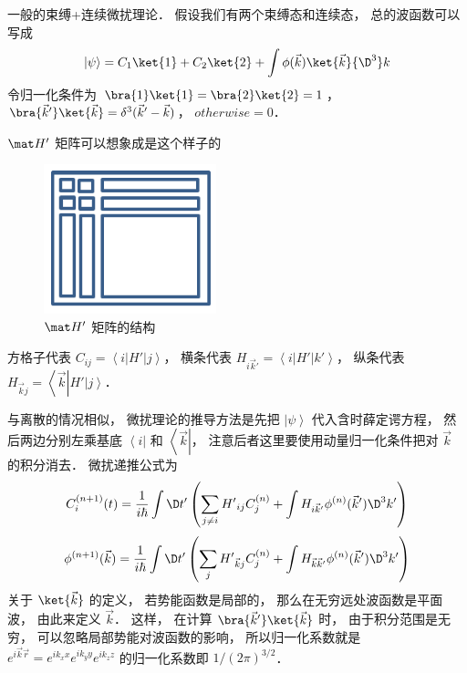 

一般的束缚+连续微扰理论． 假设我们有两个束缚态和连续态， 总的波函数可以写成
 \begin{equation}
\left| \psi  \right\rangle  = {C_1}\ket{1}  + {C_2}\ket{2}  + \int {\phi (\vec k)\ket{\vec k}{\D ^3}k} 
\end{equation}
令归一化条件为 $\bra{1}\ket{1} = \bra{2}\ket{2} = 1$，  $\bra{\vec k'}\ket{\vec k}  = {\delta ^3}(\vec k' - \vec k)$，  $otherwise = 0$． 

 $\mat H'$  矩阵可以想象成是这个样子的
\begin{figure}[h]
\centering
\includegraphics[width=5cm]{./figures/PTCont.pdf}
\caption{$\mat H'$ 矩阵的结构} 
\end{figure}

方格子代表 ${C_{ij}} = \left\langle i \right|H'\left| j \right\rangle $，  横条代表 ${H_{i\vec k'}} = \left\langle i \right|H'\left| {k'} \right\rangle $，  纵条代表 ${H_{\vec kj}} = \left\langle {\vec k} \right|H'\left| j \right\rangle $． 

与离散的情况相似， 微扰理论的推导方法是先把 $\left| \psi  \right\rangle $ 代入含时薛定谔方程， 然后两边分别左乘基底 $\left\langle i \right|$ 和 $\left\langle {\vec k} \right|$，  注意后者这里要使用动量归一化条件把对 $\vec k$ 的积分消去． 微扰递推公式为
 \begin{equation}
C_i^{(n + 1)}(t) = \frac{1}{{i\hbar }}\int {\D t'\left( {\sum\limits_{j \ne i} {{{H'}_{ij}}C_j^{(n)}}  + \int {{H_{i\vec k'}}{\phi ^{(n)}}(\vec k'){\D ^3}k'} } \right)} 
\end{equation}
 \begin{equation}
 {\phi ^{(n + 1)}}(\vec k) = \frac{1}{{i\hbar }}\int {\D t'\left( {\sum\limits_j {{{H'}_{\vec kj}}C_j^{(n)}}  + \int {{H_{\vec k\vec k'}}{\phi ^{(n)}}(\vec k'){\D ^3}k'} } \right)} 
\end{equation}
关于 $\ket{\vec k}$  的定义， 若势能函数是局部的， 那么在无穷远处波函数是平面波， 由此来定义 $\vec k$．  这样， 在计算 $\bra{\vec k'}\ket{\vec k}$ 时， 由于积分范围是无穷， 可以忽略局部势能对波函数的影响， 所以归一化系数就是 ${e^{i\vec k\vec r}} = {e^{i{k_x}x}}{e^{i{k_y}y}}{e^{i{k_z}z}}$ 的归一化系数即 $1/{(2\pi )^{3/2}}$． 
 
